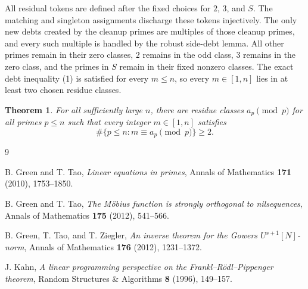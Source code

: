 \documentclass[11pt]{article}
\newtheorem{theorem}{Theorem}
\begin{document}
All residual tokens are defined after the fixed choices for $2$, $3$, and
$S$.  The matching and singleton assignments discharge these tokens
injectively.  The only new debts created by the cleanup primes are multiples of
those cleanup primes, and every such multiple is handled by the robust side-debt
lemma.  All other primes remain in their zero classes, $2$ remains in the odd
class, $3$ remains in the zero class, and the primes in $S$ remain in their
fixed nonzero classes.  The exact debt inequality (1) is satisfied for every
$m\le n$, so every $m\in[1,n]$ lies in at least two chosen residue classes.

\begin{theorem}
For all sufficiently large $n$, there are residue classes $a_p\pmod p$ for all
primes $p\le n$ such that every integer $m\in[1,n]$ satisfies
\[
  \#\{p\le n:m\equiv a_p\pmod p\}\ge2.
\]
\end{theorem}

\begin{thebibliography}{9}

B. Green and T. Tao,
\emph{Linear equations in primes},
Annals of Mathematics \textbf{171} (2010), 1753--1850.

B. Green and T. Tao,
\emph{The M\"obius function is strongly orthogonal to nilsequences},
Annals of Mathematics \textbf{175} (2012), 541--566.

B. Green, T. Tao, and T. Ziegler,
\emph{An inverse theorem for the Gowers $U^{s+1}[N]$-norm},
Annals of Mathematics \textbf{176} (2012), 1231--1372.

J. Kahn,
\emph{A linear programming perspective on the Frankl--R\"odl--Pippenger theorem},
Random Structures \& Algorithms \textbf{8} (1996), 149--157.

\end{thebibliography}
\end{document}
